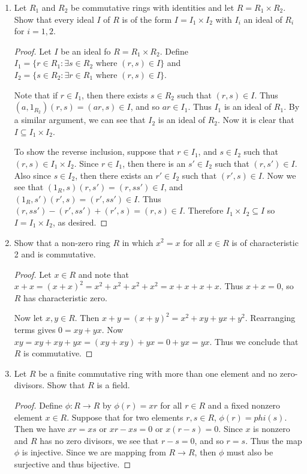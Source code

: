\documentclass{article}
\theoremstyle{definition}
\begin{document}
\begin{enumerate}
            \item Let $R_1$ and $R_2$ be commutative rings with identities and let $R=R_1\times R_2$. Show that every ideal $I$ of $R$ is of the form $I=I_1\times I_2$ with $I_i$ an ideal of $R_i$ for $i=1,2$.
            
                \begin{proof}
                    Let $I$ be an ideal fo $R=R_1\times R_2$. Define $I_1=\{r\in R_1:\exists s\in R_2 \text{ where } (r,s)\in I\}$ and $I_2=\{s\in R_2: \exists r \in R_1 \text{ where } (r,s)\in I\}$. 
                    
                    Note that if $r\in I_1$, then there exists $s\in R_2$ such that $(r,s)\in I$. Thus $(a,1_{R_2})(r,s)=(ar,s)\in I$, and so $ar\in I_1$. Thus $I_1$ is an ideal of $R_1$. By a similar argument, we can see that $I_2$ is an ideal of $R_2$. Now it is clear that $I\subseteq I_1\times I_2$. 
                    
                    To show the reverse inclusion, suppose that $r\in I_1$, and $s\in I_2$ such that $(r,s)\in I_1\times I_2$. Since $r\in I_1$, then there is an $s'\in I_2$ such that $(r,s')\in I$. Also since $s\in I_2$, then there exists an $r'\in I_2$ such that $(r',s)\in I$. Now we see that $(1_R,s)(r,s')=(r,ss')\in I$, and $(1_R,s')(r',s)=(r',ss')\in I$. Thus $(r,ss')-(r',ss')+(r',s)=(r,s)\in I$. Therefore $I_1\times I_2\subseteq I$ so $I=I_1\times I_2$, as desired.
                \end{proof}
            \item Show that a non-zero ring $R$ in which $x^2=x$ for all $x\in R$ is of characteristic 2 and is commutative.
                \begin{proof}
                    Let $x\in R$ and note that $x+x=(x+x)^2=x^2+x^2+x^2+x^2=x+x+x+x$. Thus $x+x=0$, so $R$ has characteristic zero. 

                    Now let $x,y\in R$. Then $x+y=(x+y)^2=x^2+xy+yx+y^2$. Rearranging terms gives $0=xy+yx$. Now $xy=xy+xy+yx=(xy+xy)+yx=0+yx=yx$. Thus we conclude that $R$ is commutative.
                \end{proof}
            
            \item Let $R$ be a finite commutative ring with more than one element and no zero-divisors. Show that $R$ is a field.
            
                \begin{proof}
                    Define $\phi:R\to R$ by $\phi(r)=xr$ for all $r\in R$ and a fixed nonzero element $x\in R$. Suppose that for two elements $r,s\in R$, $\phi(r)=phi(s)$. Then we have $xr=xs$ or $xr-xs=0$ or $x(r-s)=0$. Since $x$ is nonzero and $R$ has no zero divisors, we see that $r-s=0$, and so $r=s$. Thus the map $\phi$ is injective. Since we are mapping from $R\to R$, then $\phi$ must also be surjective and thus bijective. 
                    

\end{proof}
\end{enumerate}
\end{document}
